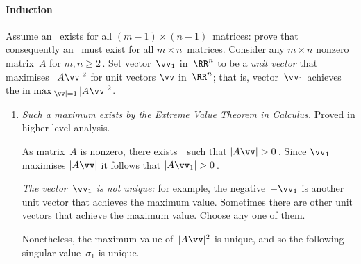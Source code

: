 \paragraph{Induction}  
Assume  an \svd\ exists for all \((m-1)\times(n-1)\)~matrices: prove that consequently an \svd\ must exist for all \(m\times n\)~matrices.
Consider any \(m\times n\) nonzero matrix~\(A\) for \(m,n\geq2\)\,.
Set vector~\(\vv_1\) in~\(\RR^n\) to be a \emph{unit vector} that maximises~\(|A\vv|^2\) for unit vectors \(\vv\) in~\(\RR^n\); that is, vector~\(\vv_1\) achieves the  in \(\max_{|\vv|=1}|A\vv|^2\).
\begin{enumerate}
\item \emph{Such a maximum exists by the Extreme Value Theorem in Calculus.}
Proved in higher level analysis.

%
As matrix~\(A\) is nonzero, there exists~\vv\ such that \(|A\vv|>0\)\,.
Since \(\vv_1\) maximises \(|A\vv|\) it follows that \(|A\vv_1|>0\)\,.

\emph{The vector~\(\vv_1\) is not unique:} for example, the negative~\(-\vv_1\) is another unit vector that achieves the maximum value.  
Sometimes there are other unit vectors that achieve the maximum value. 
Choose any one of them. 

Nonetheless, the maximum value of~\(|A\vv|^2\) is unique, and so the following singular value~\(\sigma_1\) is unique.


\end{enumerate}
